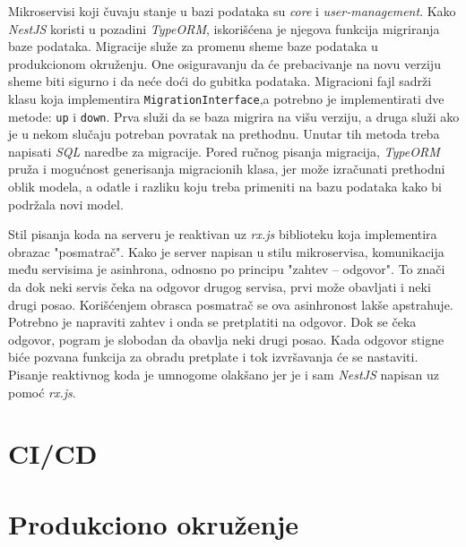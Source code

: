 Mikroservisi koji čuvaju stanje u bazi podataka su \textit{core} i 
\textit{user-management}. Kako \textit{NestJS} koristi u pozadini \textit{TypeORM}, 
iskorišćena je njegova funkcija migriranja baze podataka. Migracije služe 
za promenu sheme baze podataka u produkcionom okruženju. One osiguravanju da 
će prebacivanje na novu verziju sheme biti sigurno i da neće doći do gubitka 
podataka. Migracioni fajl sadrži klasu koja implementira 
\texttt{MigrationInterface},a potrebno je implementirati dve metode: 
\texttt{up} i \texttt{down}. Prva služi da se baza migrira na višu 
verziju, a druga služi ako je u nekom slučaju potreban povratak na prethodnu. 
Unutar tih metoda treba napisati \textit{SQL} naredbe za migracije. Pored 
ručnog pisanja migracija, \textit{TypeORM} pruža i mogućnost generisanja 
migracionih klasa, jer može izračunati prethodni oblik modela, a odatle i 
razliku koju treba primeniti na bazu podataka kako bi podržala novi model. 

Stil pisanja koda na serveru je reaktivan uz \textit{rx.js} biblioteku koja
implementira obrazac "posmatrač". Kako je server napisan u stilu mikroservisa,
komunikacija među servisima je asinhrona, odnosno po principu 
"zahtev -- odgovor". To znači da dok neki servis čeka na odgovor drugog 
servisa, prvi može obavljati i neki drugi posao. Korišćenjem obrasca 
posmatrač se ova asinhronost lakše apstrahuje. Potrebno je napraviti zahtev 
i onda se pretplatiti na odgovor. Dok se čeka odgovor, pogram je slobodan da 
obavlja neki drugi posao. Kada odgovor stigne biće pozvana funkcija 
za obradu pretplate i tok izvršavanja će se nastaviti.
Pisanje reaktivnog koda je umnogome olakšano jer je i sam \textit{NestJS} 
napisan uz pomoć \textit{rx.js}. 

\section{CI/CD}


\section{Produkciono okruženje}
